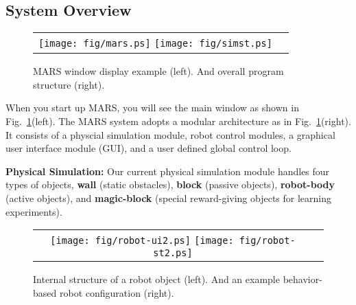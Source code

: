 \subsection{System Overview}

\begin{figure}[h]
\begin{center}
\begin{tabular}{c c}
\texttt{[image: fig/mars.ps]}
\texttt{[image: fig/simst.ps]}
\end{tabular}
\caption{\label{MARSOverview} MARS window display example (left).
And overall program structure (right).}
\end{center}
\end{figure}

When you start up MARS, you will see the main window as shown in
Fig.~\ref{MARSOverview}(left). The MARS system adopts a modular
architecture as in Fig.~\ref{MARSOverview}(right). It consists of
a physcial simulation module, robot control modules, a graphical user
interface module (GUI), and a user defined global control loop.

{\bf Physical Simulation:}
Our current physical simulation module handles four types of objects,
{\bf wall} (static obstacles), {\bf block} (passive objects), {\bf
robot-body} (active objects), and {\bf magic-block} (special
reward-giving objects for learning experiments).

\begin{figure}
\begin{center}
\begin{tabular}{c c}
\texttt{[image: fig/robot-ui2.ps]}
\texttt{[image: fig/robot-st2.ps]}
\end{tabular}
\end{center}
\caption{\label{fig:robotst} Internal structure of a robot object
(left). And an example behavior-based robot configuration (right).}
\end{figure}

